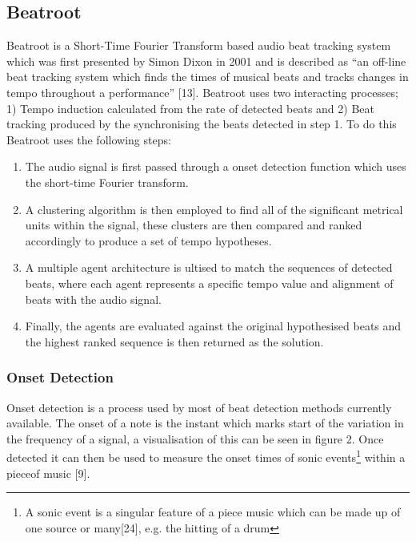 \documentclass[a4paper, 11pt]{article}
\begin{document}
\subsection{Beatroot}
Beatroot is a Short-Time Fourier Transform based audio beat tracking system which was first presented by Simon Dixon in 2001 and is described as ``an off-line beat tracking system which finds the times of musical beats and tracks changes in tempo throughout a performance'' [13]. Beatroot uses two interacting processes; 1) Tempo induction calculated from the rate of detected beats and 2) Beat tracking produced by the synchronising the beats detected in step 1. To do this Beatroot uses the following steps:

\begin{enumerate}
\item The audio signal is first passed through a onset detection function which uses the short-time Fourier transform. 
\item A clustering algorithm is then employed to find all of the significant metrical units within the signal, these clusters are then compared and ranked accordingly to produce a set of tempo hypotheses.
\item A multiple agent architecture is ultised to match the sequences of detected beats, where each agent represents a specific tempo value and alignment of beats with the audio signal.
\item Finally, the agents are evaluated against the original hypothesised beats and the highest ranked sequence is then returned as the solution.
\end{enumerate}

\subsubsection{Onset Detection}
Onset detection is a process used by most of beat detection methods currently available. The onset of a note is the instant which marks start of the variation in the frequency of a signal, a visualisation of this can be seen in figure 2. Once detected it can then be used to measure the onset times of sonic events\footnote{A sonic event is a singular feature of a piece music which can be made up of one source or many[24], e.g. the hitting of a drum} within a pieceof music [9].
\end{document}
